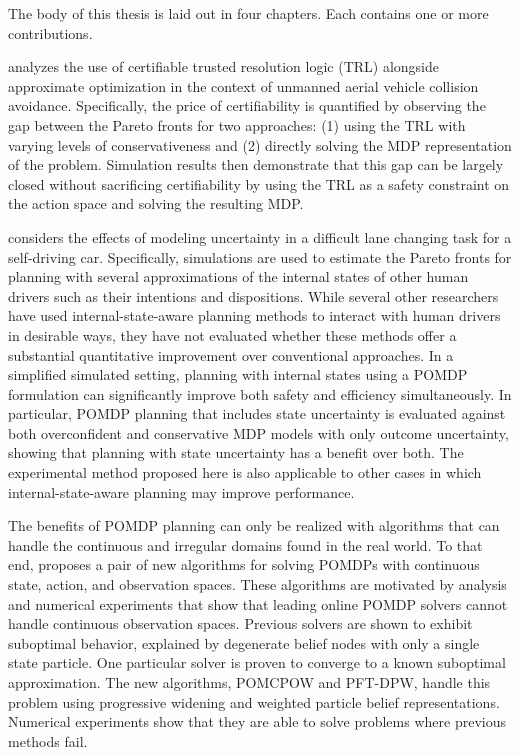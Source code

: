 The body of this thesis is laid out in four chapters.
Each contains one or more contributions.

 analyzes the use of certifiable trusted resolution logic (TRL) alongside approximate optimization in the context of unmanned aerial vehicle collision avoidance.
Specifically, the price of certifiability is quantified by observing the gap between the Pareto fronts for two approaches: (1) using the TRL with varying levels of conservativeness and (2) directly solving the MDP representation of the problem.
Simulation results then demonstrate that this gap can be largely closed without sacrificing certifiability by using the TRL as a safety constraint on the action space and solving the resulting MDP.

 considers the effects of modeling uncertainty in a difficult lane changing task for a self-driving car.
Specifically, simulations are used to estimate the Pareto fronts for planning with several approximations of the internal states of other human drivers such as their intentions and dispositions.
While several other researchers have used internal-state-aware planning methods to interact with human drivers in desirable ways, they have not evaluated whether these methods offer a substantial quantitative improvement over conventional approaches.
In a simplified simulated setting, planning with internal states using a POMDP formulation can significantly improve both safety and efficiency simultaneously.
In particular, POMDP planning that includes state uncertainty is evaluated against both overconfident and conservative MDP models with only outcome uncertainty, showing that planning with state uncertainty has a benefit over both.
The experimental method proposed here is also applicable to other cases in which internal-state-aware planning may improve performance.

The benefits of POMDP planning can only be realized with algorithms that can handle the continuous and irregular domains found in the real world.
To that end,  proposes a pair of new algorithms for solving POMDPs with continuous state, action, and observation spaces.
These algorithms are motivated by analysis and numerical experiments that show that leading online POMDP solvers cannot handle continuous observation spaces.
Previous solvers are shown to exhibit suboptimal behavior, explained by degenerate belief nodes with only a single state particle.
One particular solver is proven to converge to a known suboptimal approximation.
The new algorithms, POMCPOW and PFT-DPW, handle this problem using progressive widening and weighted particle belief representations.
Numerical experiments show that they are able to solve problems where previous methods fail.

